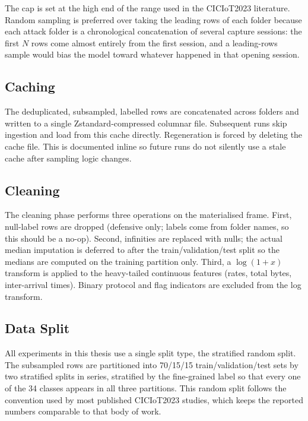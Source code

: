 \par The cap is set at the high end of the range used in the CICIoT2023 literature. Random sampling is preferred over taking the leading rows of each folder because each attack folder is a chronological concatenation of several capture sessions: the first $N$ rows come almost entirely from the first session, and a leading-rows sample would bias the model toward whatever happened in that opening session.

\subsection{Caching}
\label{subsec:caching}

\par The deduplicated, subsampled, labelled rows are concatenated across folders and written to a single Zstandard-compressed columnar file. Subsequent runs skip ingestion and load from this cache directly. Regeneration is forced by deleting the cache file. This is documented inline so future runs do not silently use a stale cache after sampling logic changes.

\subsection{Cleaning}
\label{subsec:cleaning}

\par The cleaning phase performs three operations on the materialised frame. First, null-label rows are dropped (defensive only; labels come from folder names, so this should be a no-op). Second, infinities are replaced with nulls; the actual median imputation is deferred to after the train/validation/test split so the medians are computed on the training partition only. Third, a $\log(1+x)$ transform is applied to the heavy-tailed continuous features (rates, total bytes, inter-arrival times). Binary protocol and flag indicators are excluded from the log transform.

\subsection{Data Split}
\label{subsec:split_strategies}

\par All experiments in this thesis use a single split type, the stratified random split. The subsampled rows are partitioned into 70/15/15 train/validation/test sets by two stratified splits in series, stratified by the fine-grained label so that every one of the 34 classes appears in all three partitions. This random split follows the convention used by most published CICIoT2023 studies, which keeps the reported numbers comparable to that body of work.

